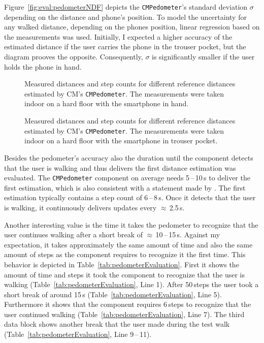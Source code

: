 Figure~\ref{fig:eval:pedometerNDF} depicts the \texttt{CMPedometer}'s standard deviation $\sigma$ depending on the distance and phone's position. To model the uncertainty for any walked distance, depending on the phones position, linear regression based on the measurements was used. Initially, I expected a higher accuracy of the estimated distance if the user carries the phone in the trouser pocket, but the diagram prooves the opposite. Consequently, $\sigma$ is significantly smaller if the user holds the phone in hand.

\begin{figure}[p]
      
	\caption{Measured distances and step counts for different reference distances estimated by \ac{CM}'s \texttt{CMPedometer}. The measurements were taken indoor on a hard floor with the smartphone in hand.}
	\label{fig:eval:pedometerHand}
\end{figure}

\begin{figure}[p]
  
  \caption{Measured distances and step counts for different reference distances estimated by \ac{CM}'s \texttt{CMPedometer}. The measurements were taken indoor on a hard floor with the smartphone in trouser pocket.}
  \label{fig:eval:pedometerPocket}
\end{figure}

Besides the pedometer's accuracy also the duration until the component detects that the user is walking and thus delivers the first distance estimation was evaluated. The \texttt{CMPedometer} component on average needs 5\,--\,10\,s to deliver the first estimation, which is also consistent with a statement made by \citet{apple:wwdc_2014_pham}. The first estimation typically contains a step count of 6\,--\,8\,s. Once it detects that the user is walking, it continuously delivers updates every $\approx$\,2.5\,s.

Another interesting value is the time it takes the pedometer to recognize that the user continues walking after a short break of $\approx$\,10\,--\,15\,s. Against my expectation, it takes approximately the same amount of time and also the same amount of steps as the component requires to recognize it the first time. This behavior is depicted in Table~\ref{tab:pedometerEvaluation}. First it shows the amount of time and steps it took the component to recognize that the user is walking (Table~\ref{tab:pedometerEvaluation}, Line 1). After 50\,steps the user took a short break of around 15\,s (Table~\ref{tab:pedometerEvaluation}, Line 5). Furthermore it shows that the component requires 6\,steps to recognize that the user continued walking (Table~\ref{tab:pedometerEvaluation}, Line 7). The third data block shows another break that the user made during the test walk (Table~\ref{tab:pedometerEvaluation}, Line 9\,--\,11).

